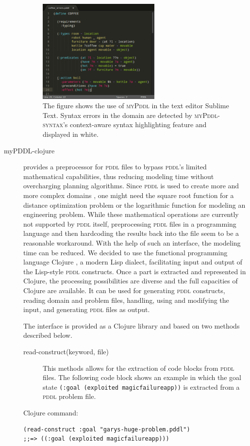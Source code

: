 \documentclass[runningheads]{llncs}
\newcommand{\mypddl}{\textsc{myPddl}\xspace}
\newcommand{\mypddlsyntax}{\textsc{myPddl-syntax}\xspace}
\newcommand{\pddl}{\textsc{pddl}\xspace}
\begin{document}
\begin{description}
  \begin{figure}
    \centering
    \includegraphics[width=0.6\textwidth]{coffee-yes.pdf}
    \caption{The figure shows the use of \mypddl in the text editor
      Sublime Text. Syntax errors in the domain are detected by
      \mypddlsyntax's context-aware syntax highlighting feature and
      displayed in white.}
\label{fig:syntax}
  \end{figure}


\item[myPDDL-clojure] provides a preprocessor for \pddl files to
  bypass \pddl's limited mathematical capabilities, thus reducing
  modeling time without overcharging planning algorithms. Since \pddl
  is used to create more and more complex domains
  \cite{goldman2012type,guerin2012academic}, one might need the square
  root function for a distance optimization problem or the logarithmic
  function for modeling an engineering problem. While these
  mathematical operations are currently not supported by \pddl itself,
  preprocessing \pddl files in a programming language and then
  hardcoding the results back into the file seem to be a reasonable
  workaround. With the help of such an interface, the modeling time
  can be reduced.  We decided to use the functional programming
  language Clojure \cite{hickey2008clojure}, a modern Lisp dialect,
  facilitating input and output of the Lisp-style \pddl
  constructs. Once a part is extracted and represented in Clojure, the
  processing possibilities are diverse and the full capacities of
  Clojure are available. It can be used for generating \pddl constructs,
  reading domain and problem files, handling, using and modifying the
  input, and generating \pddl files as output.

  The interface is provided as a Clojure library and based on two
  methods described below.
\begin{description}
\item[{read-construct(keyword, file)}] This methods allows for the
  extraction of code blocks from \pddl files. The following code block
  shows an example in which the goal state \texttt{(:goal (exploited
    magicfailureapp))} is extracted from a \pddl problem file.
\end{description}
Clojure command:
\begin{verbatim}
(read-construct :goal "garys-huge-problem.pddl")
;;=> ((:goal (exploited magicfailureapp)))
\end{verbatim}


\end{description}
\end{document}
